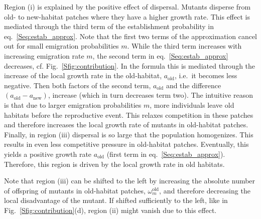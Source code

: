\documentclass[a4paper,11pt]{scrartcl}
\newcommand{\chg}[1]{\textcolor{change}{#1}}
\begin{document}
Region (i) is explained by the positive effect of dispersal. Mutants disperse from old- to new-habitat patches where they \chg{have a higher growth rate}. This effect is mediated through the third term of the establishment probability in eq.~\eqref{Seq:estab_approx}. \chg{Note that the first two terms of the approximation cancel out for small emigration probabilities $m$.}
While the third term increases with increasing emigration rate $m$, the second term in eq.~\eqref{Seq:estab_approx} decreases, cf. Fig.~\ref{Sfig:contribution}. 
In the formula this is mediated through \chg{the increase of the local growth rate in the old-habitat, $a_{\text{old}}$, i.e.\ it becomes less negative. Then both factors of the second term, $a_{\text{old}}$ and the difference $(a_{\text{old}}-a_{\text{new}})$, increase (which in turn decreases term two). The }\chg{intuitive} reason is that due to larger emigration probabilities $m$, more individuals leave old habitats before the reproductive event. This relaxes competition in these patches and therefore increases the local growth rate of mutants in old-habitat patches.   
%
Finally, in region (iii) dispersal is so large that the population homogenizes. This results in even less competitive pressure in old-habitat patches. Eventually, this yields a positive growth rate $a_{\text{old}}$ (first term in eq.~\eqref{Seq:estab_approx}). Therefore, this region is driven by the local growth rate in old habitats.

Note that region (iii) can be shifted to the left by increasing the absolute number of offspring of mutants in old-habitat patches, $\omega^\text{old}_m$, and therefore decreasing the local disadvantage of the mutant. If shifted sufficiently to the left, like in Fig.~\ref{Sfig:contribution}(d), region (ii) might vanish due to this effect.
\end{document}
